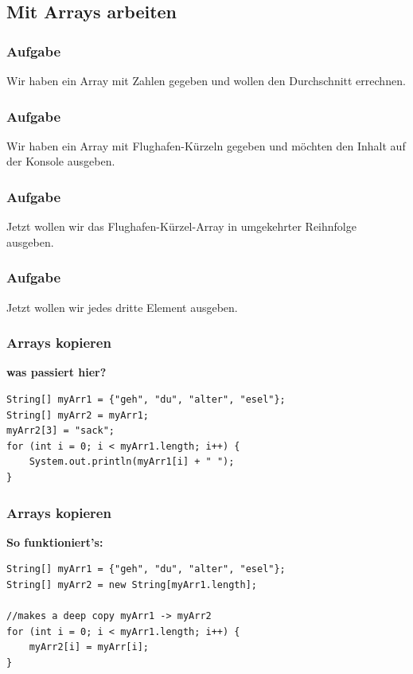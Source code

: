 \documentclass[18pt]{beamer}
\begin{document}

\subsection{Mit Arrays arbeiten}
\begin{frame}[containsverbatim]
	\frametitle{Aufgabe}
		Wir haben ein Array mit Zahlen gegeben und wollen den Durchschnitt errechnen.
\end{frame}


\begin{frame}[containsverbatim]
	\frametitle{Aufgabe}
		Wir haben ein Array mit Flughafen-Kürzeln gegeben und möchten den Inhalt auf der Konsole ausgeben.
\end{frame}


\begin{frame}[containsverbatim]
	\frametitle{Aufgabe}
		Jetzt wollen wir das Flughafen-Kürzel-Array in umgekehrter Reihnfolge ausgeben.
\end{frame}


\begin{frame}[containsverbatim]
	\frametitle{Aufgabe}
		Jetzt wollen wir jedes dritte Element ausgeben.
\end{frame}


\begin{frame}[containsverbatim]
	\frametitle{Arrays kopieren}
		
		\textbf{was passiert hier?}
		\begin{lstlisting}
String[] myArr1 = {"geh", "du", "alter", "esel"};
String[] myArr2 = myArr1;
myArr2[3] = "sack";
for (int i = 0; i < myArr1.length; i++) {
	System.out.println(myArr1[i] + " ");
}
		\end{lstlisting}
		
\end{frame}


\begin{frame}[containsverbatim]
	\frametitle{Arrays kopieren}
		\textbf{So funktioniert's:}
		\begin{lstlisting}
String[] myArr1 = {"geh", "du", "alter", "esel"};
String[] myArr2 = new String[myArr1.length];

//makes a deep copy myArr1 -> myArr2
for (int i = 0; i < myArr1.length; i++) {
	myArr2[i] = myArr[i];
}
		\end{lstlisting}
		
\end{frame}
\end{document}
